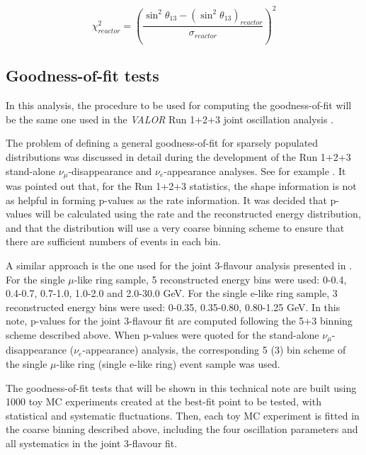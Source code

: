 \begin{equation}
\chi^2_{reactor} = (\frac{\sin^{2}\theta_{13} - (\sin^{2}\theta_{13})_{reactor} }{\sigma_{reactor}})^2
\label{eq:reactor}
\end{equation}

%

\subsection{Goodness-of-fit tests}
\label{sec:goodness_of_fit}

In this analysis, the procedure to be used for computing the goodness-of-fit will be the same one used in the {\em VALOR} Run 1+2+3 joint oscillation analysis \cite{OurJointAnalysis}. {\color{red}{Note: goodness-of-fit tests have not yet been calculated, they will be included in a later version of this technical note.}}

The problem of defining a general goodness-of-fit for sparsely populated distributions
was discussed in detail during the development of the Run 1+2+3 stand-alone $\nu_\mu$-disappearance 
and $\nu_{e}$-appearance analyses. See for example \cite{KarlenPvalue}.
It was pointed out that, for the Run 1+2+3 statistics, the shape information is not
as helpful in forming p-values as the rate information.
It was decided that  p-values will be calculated using the rate and the reconstructed energy distribution,
and that the distribution will use a very coarse binning
scheme to ensure that there are sufficient numbers of events in each bin.

A similar approach is the one used for the joint 3-flavour analysis presented in \cite{OurJointAnalysis}.
For the single $\mu$-like ring sample, 5 reconstructed energy bins were used:
0-0.4, 0.4-0.7, 0.7-1.0, 1.0-2.0 and 2.0-30.0 GeV.
For the single e-like ring sample, 3 reconstructed energy bins were used:
0-0.35, 0.35-0.80, 0.80-1.25 GeV.
In this note, p-values for the joint 3-flavour fit are computed following 
the 5+3 binning scheme described above. When p-values were quoted for the stand-alone
$\nu_{\mu}$-disappearance ($\nu_{e}$-appearance) analysis, the corresponding 
5 (3) bin scheme of the single $\mu$-like ring (single e-like ring) event sample was used.

The goodness-of-fit tests that will be shown in this technical note are built using 1000 toy MC experiments
created at the best-fit point to be tested, with statistical and systematic fluctuations.
Then, each toy MC experiment is fitted in the coarse binning described above, 
including the four oscillation parameters and all systematics in the joint 3-flavour fit.


